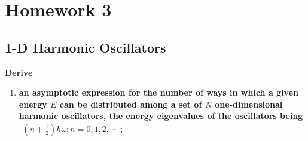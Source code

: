 \documentclass[../../main.tex]{subfiles}
\begin{document}
\section{Homework 3}

\subsection{1-D Harmonic Oscillators}
\textbf{Derive} 
  \begin{enumerate}
    \item \textbf{an asymptotic expression for the number of ways in which a given energy $E$ can be distributed among a set of $N$ one-dimensional harmonic oscillators, the energy eigenvalues of the oscillators being $\begin{aligned}
      \left(n+\frac{1}{2}\right)\hbar\omega;n=0,1,2,\cdots
    \end{aligned}$;} 


\end{enumerate}
\end{document}
